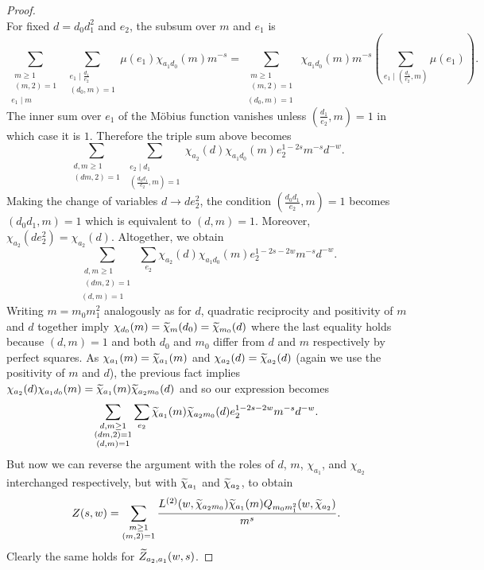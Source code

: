 \documentclass[12pt,reqno,oneside]{amsart}
\begin{document}
\begin{proof}
\[        \]
        For fixed $d = d_{0}d_{1}^{2}$ and $e_{2}$, the subsum over $m$ and $e_{1}$ is
        \[
            \sum_{\substack{\substack{m \ge 1 \\ (m,2) = 1} \\ e_{1} \mid m}}\sum_{\substack{e_{1} \mid \frac{d_{1}}{e_{2}} \\ (d_{0},m) = 1}}\mu(e_{1})\chi_{a_{1}d_{0}}(m)m^{-s} = \sum_{\substack{\substack{m \ge 1 \\ (m,2) = 1} \\ (d_{0},m) = 1}}\chi_{a_{1}d_{0}}(m)m^{-s}\left(\sum_{e_{1} \mid \left(\frac{d_{1}}{e_{2}},m\right)}\mu(e_{1})\right).
        \]
        The inner sum over $e_{1}$ of the M\"obius function vanishes unless $\left(\frac{d_{1}}{e_{2}},m\right) = 1$ in which case it is $1$. Therefore the triple sum above becomes
        \[
            \sum_{\substack{d,m \ge 1 \\ (dm,2) = 1}}\sum_{\substack{e_{2} \mid d_{1} \\ \left(\frac{d_{0}d_{1}}{e_{2}},m\right) = 1}}\chi_{a_{2}}(d)\chi_{a_{1}d_{0}}(m)e_{2}^{1-2s}m^{-s}d^{-w}.
        \]
        Making the change of variables $d \to de_{2}^{2}$, the condition $\left(\frac{d_{0}d_{1}}{e_{2}},m\right) = 1$ becomes $(d_{0}d_{1},m) = 1$ which is equivalent to $(d,m) = 1$. Moreover, $\chi_{a_{2}}(de_{2}^{2}) = \chi_{a_{2}}(d)$. Altogether, we obtain
        \[
            \sum_{\substack{\substack{d,m \ge 1 \\ (dm,2) = 1} \\ (d,m) = 1}}\sum_{e_{2}}\chi_{a_{2}}(d)\chi_{a_{1}d_{0}}(m)e_{2}^{1-2s-2w}m^{-s}d^{-w}.
        \]
        Writing $m = m_{0}m_{1}^{2}$ analogously as for $d$, quadratic reciprocity and positivity of $m$ and $d$ together imply $\chi_{d_{0}}(m) = \widetilde{\chi}_{m}(d_{0}) = \widetilde{\chi}_{m_{0}}(d)$ where the last equality holds because $(d,m) = 1$ and both $d_{0}$ and $m_{0}$ differ from $d$ and $m$ respectively by perfect squares. As $\chi_{a_{1}}(m) = \widetilde{\chi}_{a_{1}}(m)$ and $\chi_{a_{2}}(d) = \widetilde{\chi}_{a_{2}}(d)$ (again we use the positivity of $m$ and $d$), the previous fact implies $\chi_{a_{2}}(d)\chi_{a_{1}d_{0}}(m) = \widetilde{\chi}_{a_{1}}(m)\widetilde{\chi}_{a_{2}m_{0}}(d)$ and so our expression becomes
        \[
            \sum_{\substack{\substack{d,m \ge 1 \\ (dm,2) = 1} \\ (d,m) = 1}}\sum_{e_{2}}\widetilde{\chi}_{a_{1}}(m)\widetilde{\chi}_{a_{2}m_{0}}(d)e_{2}^{1-2s-2w}m^{-s}d^{-w}.
        \]
        But now we can reverse the argument with the roles of $d$, $m$, $\chi_{a_{1}}$, and $\chi_{a_{2}}$ interchanged respectively, but with $\widetilde{\chi}_{a_{1}}$ and $\widetilde{\chi}_{a_{2}}$, to obtain
        \[
            Z(s,w) = \sum_{\substack{m \ge 1 \\ (m,2) = 1}}\frac{L^{(2)}(w,\widetilde{\chi}_{a_{2}m_{0}})\widetilde{\chi}_{a_{1}}(m)Q_{m_{0}m_{1}^{2}}(w,\widetilde{\chi}_{a_{2}})}{m^{s}}.
        \]
        Clearly the same holds for $\widetilde{Z}_{a_{2},a_{1}}(w,s)$.
    \end{proof}
\end{document}
